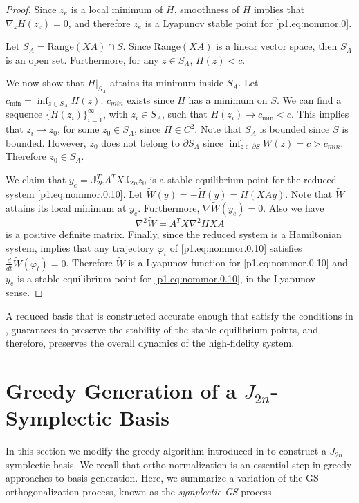 {\begin{proof}
Since $z_e$ is a local minimum of $H$, smoothness of $H$ implies that $\nabla_z H(z_e) = 0$, and therefore $z_e$ is a Lyapunov stable point for \eqref{p1.eq:nommor.0}.

Let $S_A = \text{Range}(XA)\cap S$. Since Range$(XA)$ is a linear vector space, then $S_A$ is an open set. Furthermore, for any $z\in S_A$, $H(z) < c$. 
		
We now show that $H|_{S_A}$ attains its minimum inside $S_A$. Let $c_{\text{min}} = \inf_{z\in S_A} H(z)$. $c_{min}$ exists since $H$ has a minimum on $S$. We can find a sequence $\{ H(z_i) \}_{i=1}^\infty$, with $z_i\in S_A$, such that $H(z_i)\to c_{\text{min}} < c$. This implies that $z_i\to z_0$, for some $z_0\in \overline {S_A}$, since $H\in C^2$. Note that $\overline {S_A}$ is bounded since $S$ is bounded. However, $z_0$ does not belong to $\partial S_A$ since $\inf_{z\in \partial S} W(z)=c > c_{min}$. Therefore $z_0 \in S_A$. 

We claim that $y_e = \mathbb J_{2k}^T A^T X \mathbb J_{2n} z_0$ is a stable equilibrium point for the reduced system \eqref{p1.eq:nommor.0.10}. Let $\tilde W(y) = - \tilde H(y) = H(XAy)$. Note that $\tilde W$ attains its local minimum at $y_e$. Furthermore, $\nabla \tilde W(y_e) = 0$. Also we have
\begin{equation}
	\nabla^2 \tilde W = A^T X \nabla^2 H X A
\end{equation}
is a positive definite matrix. Finally, since the reduced system is a Hamiltonian system,  implies that any trajectory $\varphi_t$ of \eqref{p1.eq:nommor.0.10} satisfies $\frac{d}{dt} \tilde W(\varphi_t) = 0$. Therefore $\tilde W$ is a Lyapunov function for \eqref{p1.eq:nommor.0.10} and $y_e$ is a stable equilibrium point for \eqref{p1.eq:nommor.0.10}, in the Lyapunov sense.
\end{proof}

A reduced basis that is constructed accurate enough that satisfy the conditions in , guarantees to preserve the stability of the stable equilibrium points, and therefore, preserves the overall dynamics of the high-fidelity system.
}

\section{Greedy Generation of a $J_{2n}$-Symplectic Basis} \label{sec:normmor.2}
In this section we modify the greedy algorithm introduced in  to construct a $J_{2n}$-symplectic basis. We recall that ortho-normalization is an essential step in greedy approaches to basis generation. Here, we summarize a variation of the GS orthogonalization process, known as the \emph{symplectic GS} process.

